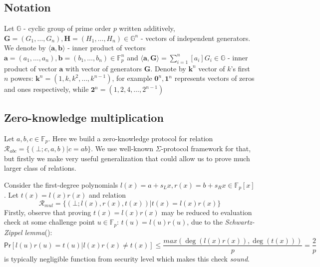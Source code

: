 \documentclass[../lecture-notes-148x210.tex]{subfiles}
\begin{document}
\subsection{Notation}
Let $\mathbb{G}$ - cyclic group of prime order $p$ written additively, $\mathbf{G} = (G_1, \dots, G_n), \mathbf{H} = (H_1, \dots, H_n) \in \mathbb{G}^n$ - vectors of independent generators. We denote by $\langle \mathbf{a,b} \rangle$ - inner product of vectors $\mathbf{a} = (a_1, \dots, a_n), \mathbf{b} = (b_1, \dots, b_n) \in \mathbb{F}_p^n$ and $\langle \mathbf{a,G} \rangle = \sum_{i=1}^n [a_i] G_i \in \mathbb{G}$ - inner product of vector $\mathbf{a}$ with vector of generators $\mathbf{G}$. Denote by $\mathbf{k}^n$ vector of $k$'s first $n$ powers: $\mathbf{k}^n = (1, k, k^2, \dots, k^{n-1})$, for example $\mathbf{0}^n, \mathbf{1}^n$ represents vectors of zeros and ones respectively, while $\mathbf{2}^{n} = (1, 2, 4, \dots, 2^{n-1})$

\subsection{Zero-knowledge multiplication}
Let $a,b,c \in \mathbb{F}_p$. Here we build a zero-knowledge protocol for relation $\mathcal{R}_{abc} = \{ (\bot;c,a,b) \vert c=ab \}$. We use well-known $\Sigma$-protocol framework for that, but firstly we make very useful generalization that could allow us to prove much larger class of relations.

Consider the first-degree polynomials $l(x) = a + s_L x, r(x) = b + s_R x \in \mathbb{F}_p[x]$. Let $t(x) = l(x)r(x)$ and relation 
$$\mathcal{R}_{mul} = \{ (\bot;l(x),r(x),t(x)) \vert t(x) = l(x)r(x)\}$$
Firstly, observe that proving $t(x) = l(x)r(x)$ may be reduced to evaluation check at some challenge point $u \in \mathbb{F}_p$: $t(u) = l(u)r(u)$, due to the \textit{Schwartz-Zippel lemma}(): 
$$\mathsf{Pr}[l(u)r(u) = t(u) \vert l(x)r(x) \neq t(x)] \le \frac{max(\deg(l(x)r(x)), \deg(t(x)))}{p} = \frac{2}{p}$$
is typically negligible function from security level which makes this check \textit{sound}.
\end{document}
